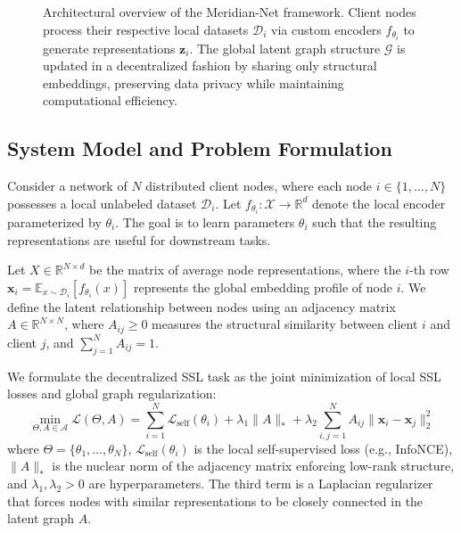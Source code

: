 \begin{figure}[t]
  \caption{Architectural overview of the Meridian-Net framework. Client nodes process their respective local datasets $\mathcal{D}_i$ via custom encoders $f_{\theta_i}$ to generate representations $\mathbf{z}_i$. The global latent graph structure $\mathcal{G}$ is updated in a decentralized fashion by sharing only structural embeddings, preserving data privacy while maintaining computational efficiency.}
  \label{fig:architecture}
\end{figure}

\subsection{System Model and Problem Formulation}
Consider a network of $N$ distributed client nodes, where each node $i \in \{1, \dots, N\}$ possesses a local unlabeled dataset $\mathcal{D}_i$. Let $f_{\theta_i}: \mathcal{X} \to \mathbb{R}^d$ denote the local encoder parameterized by $\theta_i$. The goal is to learn parameters $\theta_i$ such that the resulting representations are useful for downstream tasks.

Let $X \in \mathbb{R}^{N \times d}$ be the matrix of average node representations, where the $i$-th row $\mathbf{x}_i = \mathbb{E}_{x \sim \mathcal{D}_i}[f_{\theta_i}(x)]$ represents the global embedding profile of node $i$. We define the latent relationship between nodes using an adjacency matrix $A \in \mathbb{R}^{N \times N}$, where $A_{ij} \ge 0$ measures the structural similarity between client $i$ and client $j$, and $\sum_{j=1}^N A_{ij} = 1$.

We formulate the decentralized SSL task as the joint minimization of local SSL losses and global graph regularization:
\begin{equation}
  \min_{\Theta, A \in \mathcal{A}} \mathcal{L}(\Theta, A) = \sum_{i=1}^N \mathcal{L}_{\text{self}}(\theta_i) + \lambda_1 \|A\|_* + \lambda_2 \sum_{i,j=1}^N A_{ij} \|\mathbf{x}_i - \mathbf{x}_j\|_2^2
  \label{eq:objective}
\end{equation}
where $\Theta = \{\theta_1, \dots, \theta_N\}$, $\mathcal{L}_{\text{self}}(\theta_i)$ is the local self-supervised loss (e.g., InfoNCE), $\|A\|_*$ is the nuclear norm of the adjacency matrix enforcing low-rank structure, and $\lambda_1, \lambda_2 > 0$ are hyperparameters. The third term is a Laplacian regularizer that forces nodes with similar representations to be closely connected in the latent graph $A$.

